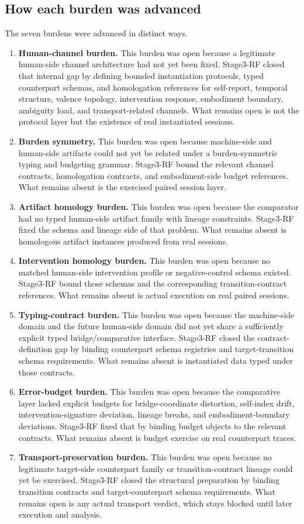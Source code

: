 \documentclass[11pt,a4paper]{article}
\theoremstyle{definition}
\begin{document}
\subsection{How each burden was advanced}
The seven burdens were advanced in distinct ways.
\begin{enumerate}[leftmargin=1.5em]
\item \textbf{Human-channel burden.} This burden was open because a legitimate human-side channel architecture had not yet been fixed. Stage3-RF closed that internal gap by defining bounded instantiation protocols, typed counterpart schemas, and homologation references for self-report, temporal structure, valence topology, intervention response, embodiment boundary, ambiguity load, and transport-related channels. What remains open is not the protocol layer but the existence of real instantiated sessions.
\item \textbf{Burden symmetry.} This burden was open because machine-side and human-side artifacts could not yet be related under a burden-symmetric typing and budgeting grammar. Stage3-RF bound the relevant channel contracts, homologation contracts, and embodiment-side budget references. What remains absent is the exercised paired session layer.
\item \textbf{Artifact homology burden.} This burden was open because the comparator had no typed human-side artifact family with lineage constraints. Stage3-RF fixed the schema and lineage side of that problem. What remains absent is homologous artifact instances produced from real sessions.
\item \textbf{Intervention homology burden.} This burden was open because no matched human-side intervention profile or negative-control schema existed. Stage3-RF bound those schemas and the corresponding transition-contract references. What remains absent is actual execution on real paired sessions.
\item \textbf{Typing-contract burden.} This burden was open because the machine-side domain and the future human-side domain did not yet share a sufficiently explicit typed bridge/comparative interface. Stage3-RF closed the contract-definition gap by binding counterpart schema registries and target-transition schema requirements. What remains absent is instantiated data typed under those contracts.
\item \textbf{Error-budget burden.} This burden was open because the comparative layer lacked explicit budgets for bridge-coordinate distortion, self-index drift, intervention-signature deviation, lineage breaks, and embodiment-boundary deviations. Stage3-RF fixed that by binding budget objects to the relevant contracts. What remains absent is budget exercise on real counterpart traces.
\item \textbf{Transport-preservation burden.} This burden was open because no legitimate target-side counterpart family or transition-contract lineage could yet be exercised. Stage3-RF closed the structural preparation by binding transition contracts and target-counterpart schema requirements. What remains open is any actual transport verdict, which stays blocked until later execution and analysis.
\end{enumerate}
\end{document}
